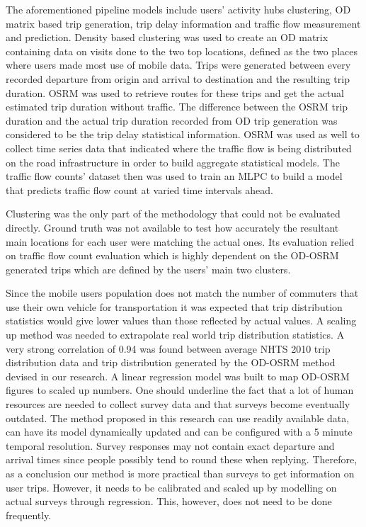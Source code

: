\documentclass[12pt, a4paper]{report}
\theoremstyle{definition}
\theoremstyle{definition}%
\theoremstyle{definition}%
\theoremstyle{definition}%
\theoremstyle{definition}%
\theoremstyle{definition}%
\begin{document}
The aforementioned pipeline models include users' activity hubs clustering, OD matrix based trip generation, trip delay information and traffic flow measurement and prediction. Density based clustering was used to create an OD matrix containing data on visits done to the two top locations, defined as the two places where users made most use of mobile data. Trips were generated between every recorded departure from origin and arrival to destination and the resulting trip duration. OSRM was used to retrieve routes for these trips and get the actual estimated trip duration without traffic. The difference between the OSRM trip duration and the actual trip duration recorded from OD trip generation was considered to be the trip delay statistical information. OSRM was used as well to collect time series data that indicated where the traffic flow is being distributed on the road infrastructure in order to build aggregate statistical models. The traffic flow counts' dataset then was used to train an MLPC to build a model that predicts traffic flow count at varied time intervals ahead.

Clustering was the only part of the methodology that could not be evaluated directly. Ground truth was not available to test how  accurately the resultant main locations for each user were matching the actual ones. Its evaluation relied on traffic flow count evaluation which is highly dependent on the OD-OSRM generated trips which are defined by the users' main two clusters.

Since the mobile users population does not match the number of commuters that use their own vehicle for transportation it was expected that trip distribution statistics would give lower values than those reflected by actual values. A scaling up method was needed to extrapolate real world trip distribution statistics. A very strong correlation of 0.94 was found between average NHTS 2010 trip distribution data and trip distribution generated by the OD-OSRM method devised in our research. A linear regression model was built to map OD-OSRM figures to scaled up numbers. One should underline the fact that a lot of human resources are needed to collect survey data and that surveys become eventually outdated. The method proposed in this research can use readily available data, can have its model dynamically updated and can be configured with a 5 minute temporal resolution. Survey responses may not contain exact departure and arrival times since people possibly tend to round these when replying. Therefore, as a conclusion our method is more practical than surveys to get information on user trips. However, it needs to be calibrated and scaled up by modelling on actual surveys through regression. This, however, does not need to be done frequently. 
\end{document}
